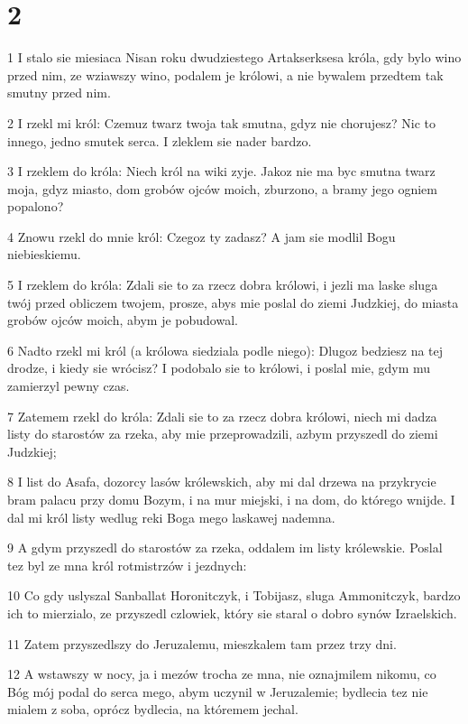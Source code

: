 \chapter{2}

\par 1 I stalo sie miesiaca Nisan roku dwudziestego Artakserksesa króla, gdy bylo wino przed nim, ze wziawszy wino, podalem je królowi, a nie bywalem przedtem tak smutny przed nim.
\par 2 I rzekl mi król: Czemuz twarz twoja tak smutna, gdyz nie chorujesz? Nic to innego, jedno smutek serca. I zleklem sie nader bardzo.
\par 3 I rzeklem do króla: Niech król na wiki zyje. Jakoz nie ma byc smutna twarz moja, gdyz miasto, dom grobów ojców moich, zburzono, a bramy jego ogniem popalono?
\par 4 Znowu rzekl do mnie król: Czegoz ty zadasz? A jam sie modlil Bogu niebieskiemu.
\par 5 I rzeklem do króla: Zdali sie to za rzecz dobra królowi, i jezli ma laske sluga twój przed obliczem twojem, prosze, abys mie poslal do ziemi Judzkiej, do miasta grobów ojców moich, abym je pobudowal.
\par 6 Nadto rzekl mi król (a królowa siedziala podle niego): Dlugoz bedziesz na tej drodze, i kiedy sie wrócisz? I podobalo sie to królowi, i poslal mie, gdym mu zamierzyl pewny czas.
\par 7 Zatemem rzekl do króla: Zdali sie to za rzecz dobra królowi, niech mi dadza listy do starostów za rzeka, aby mie przeprowadzili, azbym przyszedl do ziemi Judzkiej;
\par 8 I list do Asafa, dozorcy lasów królewskich, aby mi dal drzewa na przykrycie bram palacu przy domu Bozym, i na mur miejski, i na dom, do którego wnijde. I dal mi król listy wedlug reki Boga mego laskawej nademna.
\par 9 A gdym przyszedl do starostów za rzeka, oddalem im listy królewskie. Poslal tez byl ze mna król rotmistrzów i jezdnych:
\par 10 Co gdy uslyszal Sanballat Horonitczyk, i Tobijasz, sluga Ammonitczyk, bardzo ich to mierzialo, ze przyszedl czlowiek, który sie staral o dobro synów Izraelskich.
\par 11 Zatem przyszedlszy do Jeruzalemu, mieszkalem tam przez trzy dni.
\par 12 A wstawszy w nocy, ja i mezów trocha ze mna, nie oznajmilem nikomu, co Bóg mój podal do serca mego, abym uczynil w Jeruzalemie; bydlecia tez nie mialem z soba, oprócz bydlecia, na któremem jechal.
